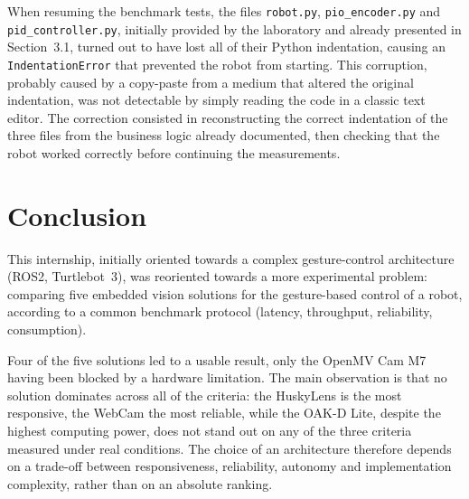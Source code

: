 \documentclass[12pt,a4paper]{report}
\begin{document}
	When resuming the benchmark tests, the files \texttt{robot.py}, \texttt{pio\_encoder.py} and \texttt{pid\_controller.py}, initially provided by the laboratory and already presented in Section~3.1, turned out to have lost all of their Python indentation, causing an \\ \texttt{IndentationError} that prevented the robot from starting. This corruption, probably caused by a copy-paste from a medium that altered the original indentation, was not detectable by simply reading the code in a classic text editor. The correction consisted in reconstructing the correct indentation of the three files from the business logic already documented, then checking that the robot worked correctly before continuing the measurements.
	
\chapter*{Conclusion}
	
	
	
	This internship, initially oriented towards a complex gesture-control architecture (ROS2, Turtlebot~3), was reoriented towards a more experimental problem: comparing five embedded vision solutions for the gesture-based control of a robot, according to a common benchmark protocol (latency, throughput, reliability, consumption).
	
	\medskip
	
	Four of the five solutions led to a usable result, only the OpenMV Cam M7 having been blocked by a hardware limitation. The main observation is that no solution dominates across all of the criteria: the HuskyLens is the most responsive, the WebCam the most reliable, while the OAK-D Lite, despite the highest computing power, does not stand out on any of the three criteria measured under real conditions. The choice of an architecture therefore depends on a trade-off between responsiveness, reliability, autonomy and implementation complexity, rather than on an absolute ranking.
	
\end{document}
